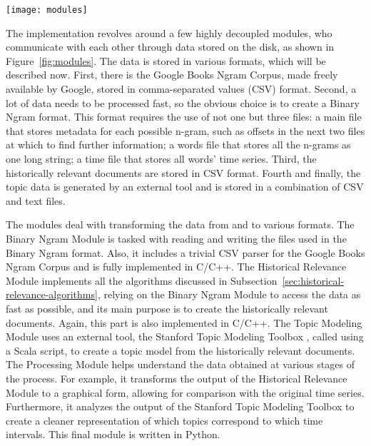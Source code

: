 
\begin{figure*}
\centering
\texttt{[image: modules]}
\caption{Modules diagram}
\label{fig:modules}
\end{figure*}

The implementation revolves around a few highly decoupled modules, who communicate with each other through data stored on the disk, as shown in Figure~\ref{fig:modules}. The data is stored in various formats, which will be described now. First, there is the Google Books Ngram Corpus, made freely available by Google, stored in comma-separated values (CSV) format. Second, a lot of data needs to be processed fast, so the obvious choice is to create a Binary Ngram format. This format requires the use of not one but three files: a main file that stores metadata for each possible n-gram, such as offsets in the next two files at which to find further information; a words file that stores all the n-grams as one long string; a time file that stores all words' time series. Third, the historically relevant documents are stored in CSV format. Fourth and finally, the topic data is generated by an external tool and is stored in a combination of CSV and text files.

The modules deal with transforming the data from and to various formats. The Binary Ngram Module is tasked with reading and writing the files used in the Binary Ngram format. Also, it includes a trivial CSV parser for the Google Books Ngram Corpus and is fully implemented in C/C++. The Historical Relevance Module implements all the algorithms discussed in Subsection~\ref{sec:historical-relevance-algorithms}, relying on the Binary Ngram Module to access the data as fast as possible, and its main purpose is to create the historically relevant documents. Again, this part is also implemented in C/C++. The Topic Modeling Module uses an external tool, the Stanford Topic Modeling Toolbox , called using a Scala script, to create a topic model from the historically relevant documents. The Processing Module helps understand the data obtained at various stages of the process. For example, it transforms the output of the Historical Relevance Module to a graphical form, allowing for comparison with the original time series. Furthermore, it analyzes the output of the Stanford Topic Modeling Toolbox to create a cleaner representation of which topics correspond to which time intervals. This final module is written in Python.
